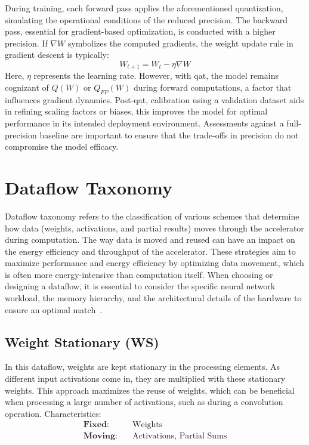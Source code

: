 During training, each forward pass applies the aforementioned quantization, simulating the operational conditions of the reduced precision. The backward pass, essential for gradient-based optimization, is conducted with a higher precision. If \( \nabla W \) symbolizes the computed gradients, the weight update rule in gradient descent is typically:
\begin{equation}
W_{t+1} = W_t - \eta \nabla W
\end{equation}
Here, \( \eta \) represents the learning rate. However, with \gls{qat}, the model remains cognizant of \( Q(W) \) or \( Q_{FP}(W) \) during forward computations, a factor that influences gradient dynamics. Post-\gls{qat}, calibration using a validation dataset aids in refining scaling factors or biases, this improves the model for optimal performance in its intended deployment environment. Assessments against a full-precision baseline are important to ensure that the trade-offs in precision do not compromise the model efficacy.

\section{Dataflow Taxonomy}
Dataflow taxonomy refers to the classification of various schemes that determine how data (weights, activations, and partial results) moves through the accelerator during computation. The way data is moved and reused can have an impact on the energy efficiency and throughput of the accelerator. These strategies aim to maximize performance and energy efficiency by optimizing data movement, which is often more energy-intensive than computation itself. When choosing or designing a dataflow, it is essential to consider the specific neural network workload, the memory hierarchy, and the architectural details of the hardware to ensure an optimal match~\cite{sze2017efficient}.

\subsection*{Weight Stationary (WS)}
In this dataflow, weights are kept stationary in the processing elements. As different input activations come in, they are multiplied with these stationary weights. This approach maximizes the reuse of weights, which can be beneficial when processing a large number of activations, such as during a convolution operation.
Characteristics:
\begin{align*}
\textbf{Fixed:} & \quad \text{Weights} \\
\textbf{Moving:} & \quad \text{Activations, Partial Sums}
\end{align*}

